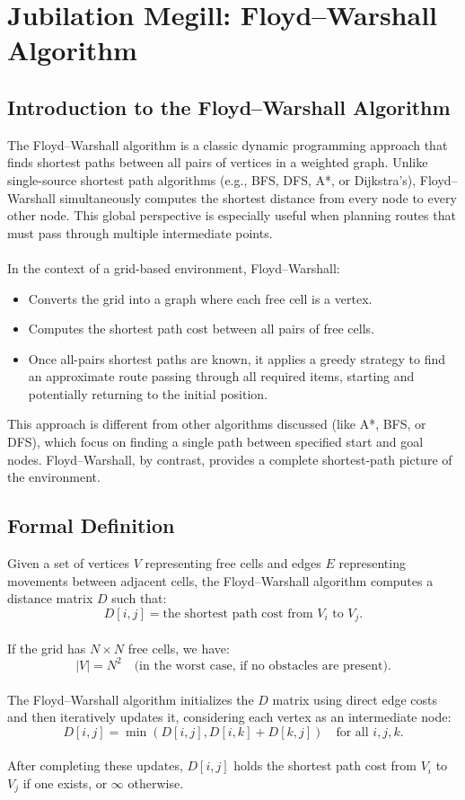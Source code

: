 \documentclass[12pt]{article}
\begin{document}
\section{Jubilation Megill: Floyd–Warshall Algorithm}
\subsection{Introduction to the Floyd–Warshall Algorithm}
The Floyd–Warshall algorithm is a classic dynamic programming approach that finds shortest paths between all pairs of vertices in a weighted graph. Unlike single-source shortest path algorithms (e.g., BFS, DFS, A*, or Dijkstra’s), Floyd–Warshall simultaneously computes the shortest distance from every node to every other node. This global perspective is especially useful when planning routes that must pass through multiple intermediate points.
\\
\\
In the context of a grid-based environment, Floyd–Warshall:
\begin{itemize}
    \item Converts the grid into a graph where each free cell is a vertex.
    \item Computes the shortest path cost between all pairs of free cells.
    \item Once all-pairs shortest paths are known, it applies a greedy strategy to find an approximate route passing through all required items, starting and potentially returning to the initial position.
\end{itemize}

\noindent This approach is different from other algorithms discussed (like A*, BFS, or DFS), which focus on finding a single path between specified start and goal nodes. Floyd–Warshall, by contrast, provides a complete shortest-path picture of the environment.

\subsection{Formal Definition}
Given a set of vertices \( V \) representing free cells and edges \( E \) representing movements between adjacent cells, the Floyd–Warshall algorithm computes a distance matrix \( D \) such that:
\[
D[i,j] = \text{the shortest path cost from } V_i \text{ to } V_j.
\]
\\
\noindent If the grid has \( N \times N \) free cells, we have:
\[
|V| = N^2 \quad\text{(in the worst case, if no obstacles are present).}
\]
\\
\noindent The Floyd–Warshall algorithm initializes the \( D \) matrix using direct edge costs and then iteratively updates it, considering each vertex as an intermediate node:
\[
D[i,j] = \min(D[i,j], D[i,k] + D[k,j]) \quad \text{for all } i,j,k.
\]
\\
\noindent After completing these updates, \( D[i,j] \) holds the shortest path cost from \( V_i \) to \( V_j \) if one exists, or \(\infty\) otherwise.
\end{document}
